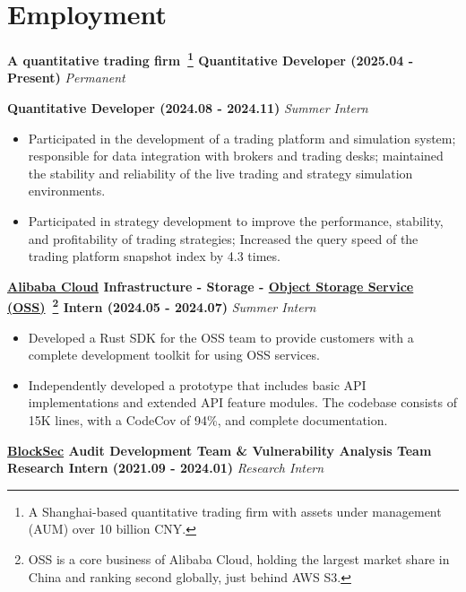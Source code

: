 \ifdefined\english

    \section*{Employment}

    \noindent\textbf{A quantitative trading firm~\footnote{A Shanghai-based quantitative trading firm with assets under management (AUM) over 10 billion CNY.} \textbar{} Quantitative Developer (2025.04 - Present)} \hfill \textsl{Permanent}

    \noindent\textbf{ \textbar{} Quantitative Developer (2024.08 - 2024.11)} \hfill \textsl{Summer Intern}

    \begin{itemize}
        \item Participated in the development of a trading platform and simulation system; responsible for data integration with brokers and trading desks; maintained the stability and reliability of the live trading and strategy simulation environments.
        \item Participated in strategy development to improve the performance, stability, and profitability of trading strategies; Increased the query speed of the trading platform snapshot index by 4.3 times.
    \end{itemize}

    \noindent\textbf{\href{https://www.alibabacloud.com}{Alibaba Cloud} \textbar{} Infrastructure - Storage - \href{https://www.alibabacloud.com/en/product/object-storage-service}{Object Storage Service (OSS)}~\footnote{OSS is a core business of Alibaba Cloud, holding the largest market share in China and ranking second globally, just behind AWS S3.} \textbar{} Intern (2024.05 - 2024.07)} \hfill \textsl{Summer Intern}

    \begin{itemize}
        \item Developed a Rust SDK for the OSS team to provide customers with a complete development toolkit for using OSS services.
        \item Independently developed a prototype that includes basic API implementations and extended API feature modules. The codebase consists of 15K lines, with a CodeCov of 94\%, and complete documentation.
    \end{itemize}

    \noindent\textbf{\href{https://blocksec.com}{BlockSec} \textbar{} Audit Development Team \& Vulnerability Analysis Team \textbar{} Research Intern (2021.09 - 2024.01)} \hfill \textsl{Research Intern}


